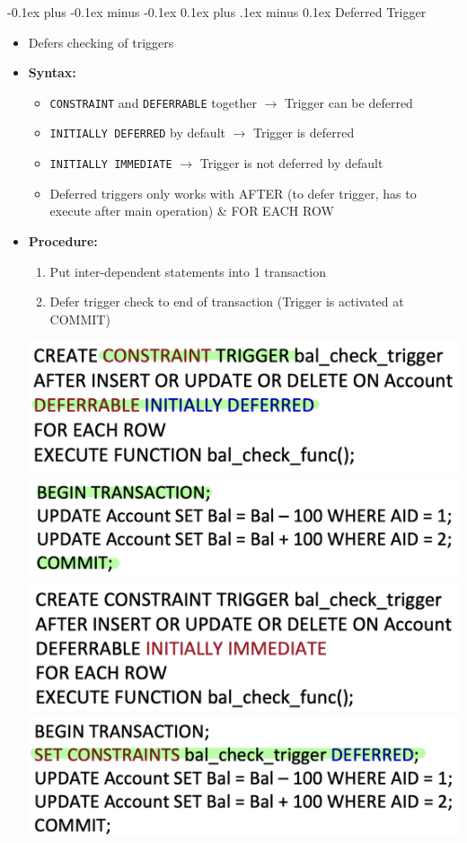 \documentclass[landscape]{article}
\makeatletter
\renewcommand{\subsection}{\@startsection{subsection}{2}{0mm}%
  {-0.1ex plus -0.1ex minus -0.1ex}%
  {0.1ex plus .1ex minus 0.1ex}%
{\normalfont\scriptsize\bfseries}}
\makeatother
\begin{document}
\begin{multicols*}{5}
    \subsection{Deferred Trigger}
    \begin{itemize}
      \item Defers checking of triggers
      \item \textbf{Syntax:}
      \begin{itemize}
        \item \verb|CONSTRAINT| and \verb|DEFERRABLE| together $\rightarrow$ Trigger can be deferred
        \item \verb|INITIALLY DEFERRED| by default $\rightarrow$ Trigger is deferred
        \item \verb|INITIALLY IMMEDIATE| $\rightarrow$ Trigger is not deferred by default
        \item Deferred triggers only works with AFTER (to defer trigger, has to execute after main operation) \& FOR EACH ROW
      \end{itemize}
      \item \textbf{Procedure:}
      \begin{enumerate}
        \item Put inter-dependent statements into 1 transaction
        \item Defer trigger check to end of transaction (Trigger is activated at COMMIT)
      \end{enumerate}
      \includegraphics[width=0.6\linewidth]{23_trigger_defer_1.png}
      \includegraphics[width=0.6\linewidth]{24_trigger_defer_2.png}
      \includegraphics[width=0.6\linewidth]{25_trigger_defer_3.png}
      \includegraphics[width=0.6\linewidth]{26_trigger_defer_4.png}
    \end{itemize}


\end{multicols*}
\end{document}
